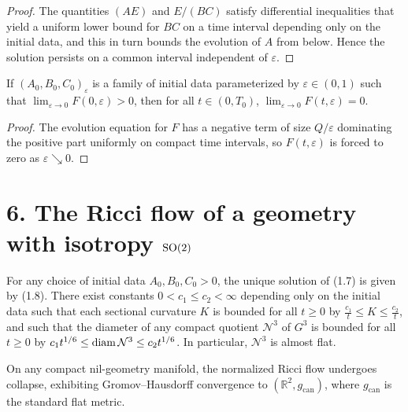 \begin{proof}
The quantities $(AE)$ and $E/(BC)$ satisfy differential inequalities that yield a uniform lower bound for $BC$ on a time interval depending only on the initial data, and this in turn bounds the evolution of $A$ from below. Hence the solution persists on a common interval independent of $\varepsilon$.
\end{proof}

\begin{lemma}
\label{ch01-lem-collapse-discontinuity}
If $(A_0,B_0,C_0)_\varepsilon$ is a family of initial data parameterized by $\varepsilon\in(0,1)$ such that $\lim_{\varepsilon\to 0}F(0,\varepsilon)>0$, then for all $t\in(0,T_0)$, $\lim_{\varepsilon\to 0}F(t,\varepsilon)=0$.
\end{lemma}

\begin{proof}
The evolution equation for $F$ has a negative term of size $Q/\varepsilon$ dominating the positive part uniformly on compact time intervals, so $F(t,\varepsilon)$ is forced to zero as $\varepsilon\searrow 0$.
\end{proof}

\section*{6. The Ricci flow of a geometry with isotropy $\mathrm{SO}(2)$}

\begin{proposition}
\label{ch01-prop-nil}
For any choice of initial data $A_0,B_0,C_0 > 0$, the unique solution of (1.7) is given by (1.8). There exist constants $0 < c_1 \leq c_2 < \infty$ depending only on the initial data such that each sectional curvature $K$ is bounded for all $t \geq 0$ by $\frac{c_1}{t} \leq K \leq \frac{c_2}{t}$, and such that the diameter of any compact quotient $\mathcal{N}^3$ of $G^3$ is bounded for all $t \geq 0$ by $c_1 t^{1/6} \leq \operatorname{diam} \mathcal{N}^3 \leq c_2 t^{1/6}$. In particular, $\mathcal{N}^3$ is almost flat.
\end{proposition}

\begin{corollary}
\label{ch01-cor-nil-collapse}
On any compact nil-geometry manifold, the normalized Ricci flow undergoes collapse, exhibiting Gromov--Hausdorff convergence to $(\mathbb{R}^2,g_{\mathrm{can}})$, where $g_{\mathrm{can}}$ is the standard flat metric.
\end{corollary}

